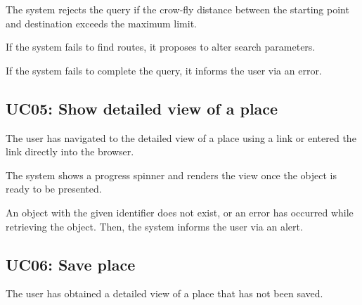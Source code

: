 
\begin{ucitemize}
\item The system rejects the query if the crow-fly distance between the starting point and destination exceeds the maximum limit.
\item If the system fails to find routes, it proposes to alter search parameters.
\item If the system fails to complete the query, it informs the user via an error.
\end{ucitemize}

\subsection{UC05: Show detailed view of a place}\label{sssec:uc-detailed-view}


\begin{ucitemize}
\item The user has navigated to the detailed view of a place using a link or entered the link directly into the browser.
\end{ucitemize}

\newpage


\begin{ucenumerate}
\item The system shows a progress spinner and renders the view once the object is ready to be presented.
\end{ucenumerate}


\begin{ucitemize}
\item An object with the given identifier does not exist, or an error has occurred while retrieving the object. Then, the system informs the user via an alert.
\end{ucitemize}

\subsection{UC06: Save place}\label{sssec:uc-save-place}


\begin{ucitemize}
\item The user has obtained a detailed view of a place that has not been saved.
\end{ucitemize}

